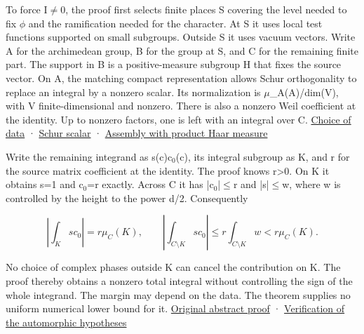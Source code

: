 \documentclass[11pt,letterpaper]{article}
\begin{document}
To force I\ensuremath{\ne}0, the proof first selects finite places S covering the level needed to fix \ensuremath{\phi} and the ramification needed for the character. At S it uses local test functions supported on small subgroups. Outside S it uses vacuum vectors. Write A for the archimedean group, B for the group at S, and C for the remaining finite part. The support in B is a positive-measure subgroup H that fixes the source vector. On A, the matching compact representation allows Schur orthogonality to replace an integral by a nonzero scalar. Its normalization is \ensuremath{\mu}\_A(A)/dim(V), with V finite-dimensional and nonzero. There is also a nonzero Weil coefficient at the identity. Up to nonzero factors, one is left with an integral over C. \href{https://github.com/nousentllc/riemann-hypothesis/blob/40e56bab026552e089d7afcfeff08d2defb9c005/src/Development/AutomorphicArithmetic/Foundations/GaloisRepresentations/ThetaParseval/ThetaKernels/TPGNonVan.lean\#L39-L87}{Choice of data} · \href{https://github.com/nousentllc/riemann-hypothesis/blob/40e56bab026552e089d7afcfeff08d2defb9c005/src/Development/AutomorphicArithmetic/Foundations/GaloisRepresentations/ThetaParseval/ThetaKernels/TPGSchurStep.lean\#L193-L212}{Schur scalar} · \href{https://github.com/nousentllc/riemann-hypothesis/blob/40e56bab026552e089d7afcfeff08d2defb9c005/src/Development/AutomorphicArithmetic/Foundations/GaloisRepresentations/ThetaParseval/ThetaKernels/TPGNonVan.lean\#L116-L151}{Assembly with product Haar measure}

Write the remaining integrand as s(c)c\ensuremath{{}_{0}}(c), its integral subgroup as K, and r for the source matrix coefficient at the identity. The proof knows r>0. On K it obtains s=1 and c\ensuremath{{}_{0}}=r exactly. Across C it has |c\ensuremath{{}_{0}}|\ensuremath{\le}r and |s|\ensuremath{\le}w, where w is controlled by the height to the power d/2. Consequently

\[\left|\int_K sc_0\right|=r\mu_C(K),\qquad
\left|\int_{C\setminus K}sc_0\right|\leq r\int_{C\setminus K}w
< r\mu_C(K).\]

No choice of complex phases outside K can cancel the contribution on K. The proof thereby obtains a nonzero total integral without controlling the sign of the whole integrand. The margin may depend on the data. The theorem supplies no uniform numerical lower bound for it. \href{https://github.com/nousentllc/riemann-hypothesis/blob/40e56bab026552e089d7afcfeff08d2defb9c005/src/Development/AutomorphicArithmetic/Foundations/GaloisRepresentations/ThetaParseval/BlockDeterminants/AbsNe.lean\#L31-L64}{Original abstract proof} · \href{https://github.com/nousentllc/riemann-hypothesis/blob/40e56bab026552e089d7afcfeff08d2defb9c005/src/Development/AutomorphicArithmetic/Foundations/GaloisRepresentations/ThetaParseval/ThetaKernels/TPGNonVan.lean\#L130-L154}{Verification of the automorphic hypotheses}
\end{document}
